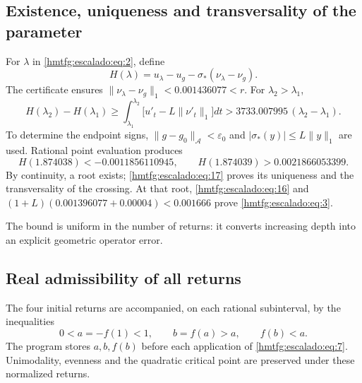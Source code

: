 \subsection{Existence, uniqueness and transversality of the parameter}
\label{hmtfg:escalado:6}

For \(\lambda\) in \eqref{hmtfg:escalado:eq:2}, define
\[
H(\lambda)=u_\lambda-u_g-
\sigma_*(\nu_\lambda-\nu_g).
\]
The certificate ensures \(\|\nu_\lambda-\nu_g\|_1<0.001436077<r\). For \(\lambda_2>\lambda_1\),
\begin{equation}
H(\lambda_2)-H(\lambda_1)
\ge\int_{\lambda_1}^{\lambda_2}
\bigl[u'_t-L\|\nu'_t\|_1\bigr]dt
>3733.007995\,(\lambda_2-\lambda_1).
\label{hmtfg:escalado:eq:17}
\end{equation}
To determine the endpoint signs, \(\|g-g_0\|_{\mathcal A}<\varepsilon_0\) and \(|\sigma_*(y)|\le L\|y\|_1\) are used. Rational point evaluation produces
\begin{equation}
H(1.874038)<-0.0011856110945,
\qquad H(1.874039)>0.0021866053399.
\label{hmtfg:escalado:eq:18}
\end{equation}
By continuity, a root exists; \eqref{hmtfg:escalado:eq:17} proves its uniqueness and the transversality of the crossing. At that root, \eqref{hmtfg:escalado:eq:16} and
\((1+L)(0.001396077+0.00004)<0.001666\)
prove \eqref{hmtfg:escalado:eq:3}.

The bound is uniform in the number of returns: it converts increasing depth into an explicit geometric operator error.


\subsection{Real admissibility of all returns}
\label{hmtfg:escalado:7}

The four initial returns are accompanied, on each rational subinterval, by the inequalities
\begin{equation}
0<a=-f(1)<1,\qquad b=f(a)>a,\qquad f(b)<a.
\label{hmtfg:escalado:eq:19}
\end{equation}
The program stores \(a,b,f(b)\) before each application of \eqref{hmtfg:escalado:eq:7}. Unimodality, evenness and the quadratic critical point are preserved under these normalized returns.

